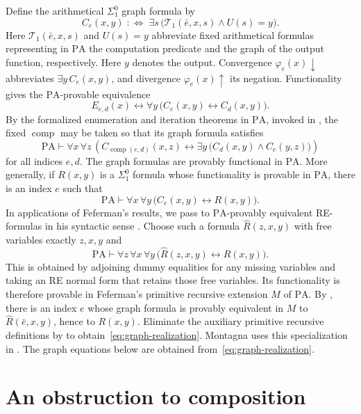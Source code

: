 \documentclass[11pt]{article}
\newcommand{\PA}{\mathrm{PA}}
\newcommand{\comp}{\operatorname{comp}}
\begin{document}
Define the arithmetical $\Sigma^0_1$ graph formula by
\[
 C_e(x,y)\;:\Longleftrightarrow\;
 \exists s\,\bigl(\mathcal{T}_1(\bar e,x,s)\land U(s)=y\bigr).
\]
Here $\mathcal{T}_1(\bar e,x,s)$ and $U(s)=y$ abbreviate fixed arithmetical
formulas representing in $\PA$ the computation predicate and the
graph of the output function, respectively.
Here $y$ denotes the output.
Convergence $\varphi_e(x)\downarrow$ abbreviates
$\exists y\,C_e(x,y)$, and divergence $\varphi_e(x)\uparrow$ its
negation. Functionality gives the $\PA$-provable equivalence
\[
 E_{e,d}(x)\longleftrightarrow
 \forall y\,\bigl(C_e(x,y)\longleftrightarrow C_d(x,y)\bigr).
\]
By the formalized enumeration and iteration theorems in $\PA$, invoked in
\cite[p.~647]{DiPaolaMontagna}, the fixed $\comp$ may be taken so that its
graph formula satisfies
\begin{equation}\label{eq:composition-graph}
 \PA\vdash\forall x\,\forall z\,
 \left(C_{\comp(e,d)}(x,z)\longleftrightarrow
       \exists y\,\bigl(C_d(x,y)\land C_e(y,z)\bigr)\right)
\end{equation}
for all indices $e,d$. The graph formulas are provably functional in
$\PA$. More generally, if $R(x,y)$ is a $\Sigma^0_1$ formula whose
functionality is provable in $\PA$, there is an index $e$ such that
\begin{equation}\label{eq:graph-realization}
 \PA\vdash\forall x\,\forall y\,
 \bigl(C_e(x,y)\longleftrightarrow R(x,y)\bigr).
\end{equation}
In applications of Feferman's results, we pass to
$\PA$-provably equivalent RE-formulas in his syntactic sense
\cite[p.~267]{Feferman}.
Choose such a formula $\widehat R(z,x,y)$ with free variables
exactly $z,x,y$ and
\[
 \PA\vdash\forall z\,\forall x\,\forall y\,
 \bigl(\widehat R(z,x,y)\longleftrightarrow R(x,y)\bigr).
\]
This is obtained by adjoining dummy equalities for any missing
variables and taking an RE normal form that retains those
free variables.
Its functionality is therefore provable in Feferman's primitive
recursive extension $M$ of $\PA$.
By \cite[Theorem~2.13, p.~273]{Feferman}, there is an index $e$
whose graph formula is provably equivalent in $M$ to
$\widehat R(\bar e,x,y)$, hence to $R(x,y)$.
Eliminate the auxiliary
primitive recursive definitions by \cite[Theorem~2.15, p.~274]{Feferman}
to obtain~\eqref{eq:graph-realization}. Montagna uses this specialization
in \cite[p.~109, proof of~$(*)$]{Montagna}.
The graph equations below are obtained from~\eqref{eq:graph-realization}.

\section{An obstruction to composition}\label{sec:obstruction}
\end{document}
